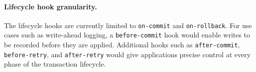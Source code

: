 \paragraph{Lifecycle hook granularity.}
The lifecycle hooks are currently limited to \texttt{on-commit} and \texttt{on-rollback}.
For use cases such as write-ahead logging, a \texttt{before-commit} hook would
enable writes to be recorded before they are applied.
Additional hooks such as \texttt{after-commit}, \texttt{before-retry},
and \texttt{after-retry} would give applications precise control at every
phase of the transaction lifecycle.